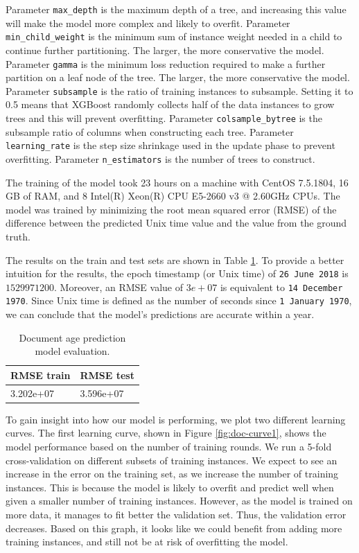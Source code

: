 Parameter \texttt{max\_depth} is the maximum depth of a tree, and increasing this value will make the model more complex and likely to overfit. Parameter \texttt{min\_child\_weight} is the minimum sum of instance weight needed in a child to continue further partitioning. The larger, the more conservative the model. Parameter \texttt{gamma} is the minimum loss reduction required to make a further partition on a leaf node of the tree. The larger, the more conservative the model. Parameter \texttt{subsample} is the ratio of training instances to subsample. Setting it to 0.5 means that XGBoost randomly collects half of the data instances to grow trees and this will prevent overfitting. Parameter \texttt{colsample\_bytree} is the subsample ratio of columns when constructing each tree. Parameter \texttt{learning\_rate} is the step size shrinkage used in the update phase to prevent overfitting. Parameter \texttt{n\_estimators} is the number of trees to construct.

The training of the model took 23 hours on a machine with CentOS 7.5.1804, 16 GB of RAM, and 8 Intel(R) Xeon(R) CPU E5-2660 v3 @ 2.60GHz CPUs. The model was trained by minimizing the root mean squared error (RMSE) of the difference between the predicted Unix time value and the value from the ground truth. 

The results on the train and test sets are shown in Table \ref{tb:docclass}. To provide a better intuition for the results, the epoch timestamp (or Unix time) of \texttt{26 June 2018} is $1529971200$. Moreover, an RMSE value of $3e+07$ is equivalent to \texttt{14 December 1970}. Since Unix time is defined as the number of seconds since \texttt{1 January 1970}, we can conclude that the model's predictions are accurate within a year.

\begin{table}[h!]
\centering
\caption{Document age prediction model evaluation.}
\label{tb:docclass}
\begin{tabular}{@{}ll@{}}
\toprule
RMSE train & RMSE test \\ \midrule
3.202e+07  & 3.596e+07 \\ \bottomrule
\end{tabular}
\end{table}

To gain insight into how our model is performing, we plot two different learning curves. The first learning curve, shown in Figure \ref{fig:doc-curve1}, shows the model performance based on the number of training rounds. We run a 5-fold cross-validation on different subsets of training instances. We expect to see an increase in the error on the training set, as we increase the number of training instances. This is because the model is likely to overfit and predict well when given a smaller number of training instances. However, as the model is trained on more data, it manages to fit better the validation set. Thus, the validation error decreases. Based on this graph, it looks like we could benefit from adding more training instances, and still not be at risk of overfitting the model.

